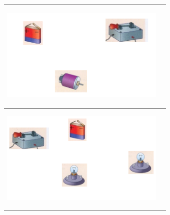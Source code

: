 \documentclass[11pt]{article}
\begin{document}
\begin{question}
\begin{center}
\begin{tabular}{ |p{8cm}|p{8cm}| }
		  \begin{minipage}{.3\textwidth}
			\begin{center}
				\includegraphics[width=8cm]{Dessin2.png}
			\end{center}
		  \end{minipage} &   \\\hline


		  \begin{minipage}{.3\textwidth}
			\begin{center}
				\includegraphics[width=8cm]{Dessin3.png}
			\end{center}
		  \end{minipage} &   \\\hline
		\end{tabular}
	\end{center}

	\end{question}
\end{document}
